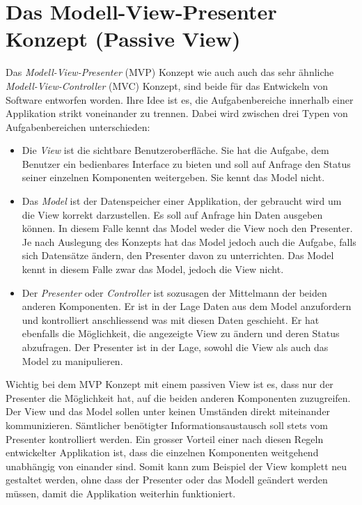 \documentclass[../main.tex]{subfiles}
\begin{document}
\section{Das Modell-View-Presenter Konzept (Passive View)} \label{mvp}
Das \emph{Modell-View-Presenter} (MVP) Konzept wie auch auch das sehr ähnliche \emph{Modell-View-Controller} (MVC) Konzept, sind beide für das Entwickeln von Software entworfen worden. Ihre Idee ist es, die Aufgabenbereiche innerhalb einer Applikation strikt voneinander zu trennen. Dabei wird zwischen drei Typen von Aufgabenbereichen unterschieden:
\begin{itemize}
	\item Die \emph{View} ist die sichtbare Benutzeroberfläche. Sie hat die Aufgabe, dem Benutzer ein bedienbares Interface zu bieten und soll auf Anfrage den Status seiner einzelnen Komponenten weitergeben. Sie kennt das Model nicht.
	\item Das \emph{Model} ist der Datenspeicher einer Applikation, der gebraucht wird um die View korrekt darzustellen. Es soll auf Anfrage hin Daten ausgeben können. In diesem Falle kennt das Model weder die View noch den Presenter. Je nach Auslegung des Konzepts hat das Model jedoch auch die Aufgabe, falls sich Datensätze ändern, den Presenter davon zu unterrichten. Das Model kennt in diesem Falle zwar das Model, jedoch die View nicht.
	\item Der \emph{Presenter} oder \emph{Controller} ist sozusagen der Mittelmann der beiden anderen Komponenten. Er ist in der Lage Daten aus dem Model anzufordern und kontrolliert anschliessend was mit diesen Daten geschieht. Er hat ebenfalls die Möglichkeit, die angezeigte View zu ändern und deren Status abzufragen. Der Presenter ist in der Lage, sowohl die View als auch das Model zu manipulieren.
\end{itemize}
Wichtig bei dem MVP Konzept mit einem passiven View ist es, dass nur der Presenter die Möglichkeit hat, auf die beiden anderen Komponenten zuzugreifen. Der View und das Model sollen unter keinen Umständen direkt miteinander kommunizieren. Sämtlicher benötigter Informationsaustausch soll stets vom Presenter kontrolliert werden.\cite{mvp} Ein grosser Vorteil einer nach diesen Regeln entwickelter Applikation ist, dass die einzelnen Komponenten weitgehend unabhängig von einander sind. Somit kann zum Beispiel der View komplett neu gestaltet werden, ohne dass der Presenter oder das Modell geändert werden müssen, damit die Applikation weiterhin funktioniert.
	
\end{document}
